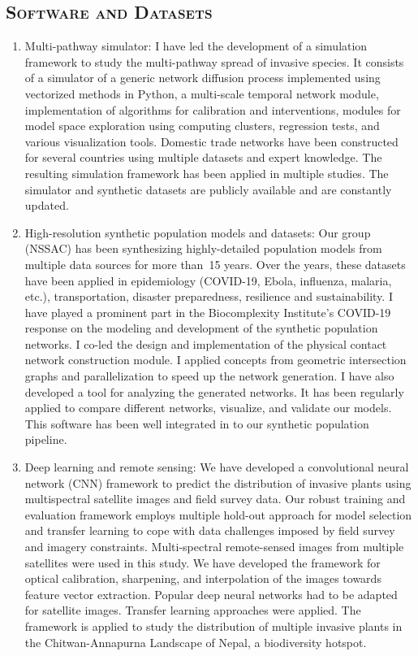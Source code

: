 \documentclass[margin,10pt]{res}
\begin{document}
\begin{resume}
\section{\textnormal{\textsc{Software and Datasets}}}
\begin{enumerate}[$\circ$]
\item Multi-pathway simulator: I have led the development of a simulation
framework to study the multi-pathway spread of invasive species. It
consists of a simulator of a generic network diffusion process implemented
using vectorized methods in Python, a multi-scale temporal network module,
implementation of algorithms for calibration and interventions, modules for
model space exploration using computing clusters, regression tests, and
various visualization tools. Domestic trade networks have been constructed
for several countries using multiple datasets and expert knowledge. The
resulting simulation framework has been applied in multiple studies. The
simulator and synthetic datasets are publicly available and are constantly
updated.
\item High-resolution synthetic population models and datasets: Our group
(NSSAC) has been synthesizing highly-detailed population models from
multiple data sources for more than~15 years. Over the years, these
datasets have been applied in epidemiology (COVID-19, Ebola, influenza,
malaria, etc.), transportation, disaster preparedness, resilience and
sustainability. I have played a prominent part in the Biocomplexity
Institute's COVID-19 response on the modeling and development of the
synthetic population networks. I co-led the design and implementation of
the physical contact network construction module. I applied concepts from
geometric intersection graphs and parallelization to speed up the network
generation. I have also developed a tool for analyzing the generated
networks. It has been regularly applied to compare different networks,
visualize, and validate our models. This software has been well integrated
in to our synthetic population pipeline.
\item Deep learning and remote sensing: We have developed a convolutional
neural network (CNN) framework to predict the distribution of invasive
plants using multispectral satellite images and field survey data.  Our
robust training and evaluation framework employs multiple hold-out approach
for model selection and transfer learning to cope with data challenges
imposed by field survey and imagery constraints.  Multi-spectral
remote-sensed images from multiple satellites were used in this study. We
have developed the framework for optical calibration, sharpening, and
interpolation of the images towards feature vector extraction. Popular
deep neural networks had to be adapted for satellite images. Transfer
learning approaches were applied. The framework is applied to study the
distribution of multiple invasive plants in the Chitwan-Annapurna Landscape
of Nepal, a biodiversity hotspot.
\end{enumerate}


\end{resume}
\end{document}
